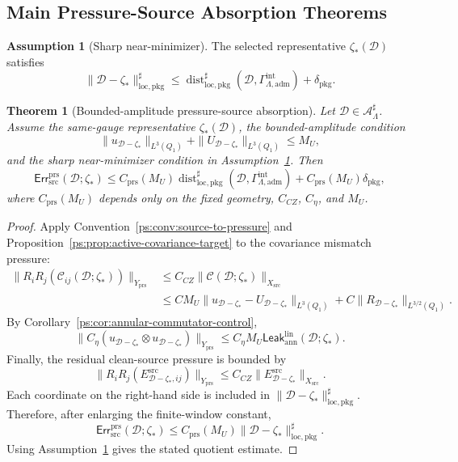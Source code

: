 \documentclass[11pt]{article}
\numberwithin{equation}{section}
\newtheorem{theorem}{Theorem}[section]
\theoremstyle{definition}
\newtheorem{assumption}[assumption]{Assumption}
\theoremstyle{remark}
\newcommand{\loc}{\mathrm{loc}}
\newcommand{\pkg}{\mathrm{pkg}}
\newcommand{\adm}{\mathrm{adm}}
\newcommand{\prs}{\mathrm{prs}}
\newcommand{\src}{\mathrm{src}}
\newcommand{\Err}{\mathsf{Err}}
\newcommand{\Leak}{\mathsf{Leak}}
\newcommand{\Dist}{\operatorname{dist}}
\newcommand{\calA}{\mathcal A}
\newcommand{\calD}{\mathcal D}
\newcommand{\Xsrc}{X_{\src}}
\newcommand{\Yprs}{Y_{\prs}}
\newcommand{\Qone}{Q_1}
\newcommand{\Gadm}{\Gamma^{\mathrm{int}}_{\Lambda,\adm}}
\begin{document}
\subsection{Main Pressure-Source Absorption Theorems}
\label{ps:sec:main-absorption}

\begin{assumption}[Sharp near-minimizer]
\label{ps:ass:sharp-near-minimizer}
The selected representative \(\zeta_*(\calD)\) satisfies
\[
    \|\calD-\zeta_*\|_{\loc,\pkg}^{\sharp}
    \le
    \Dist_{\loc,\pkg}^{\sharp}(\calD,\Gadm)
    +
    \delta_{\pkg}.
\]
\end{assumption}

\begin{theorem}[Bounded-amplitude pressure-source absorption]
\label{ps:thm:bounded-amplitude-pressure-source-absorption}
Let \(\calD\in\calA^\sharp_\Lambda\).  Assume the same-gauge representative
\(\zeta_*(\calD)\), the bounded-amplitude condition
\[
    \|u_{\calD-\zeta_*}\|_{L^3(\Qone)}
    +
    \|U_{\calD-\zeta_*}\|_{L^3(\Qone)}
    \le
    M_U,
\]
and the sharp near-minimizer condition in
Assumption~\ref{ps:ass:sharp-near-minimizer}.  Then
\[
    \Err^{\prs}_{\src}(\calD;\zeta_*)
    \le
    C_{\prs}(M_U)
    \Dist_{\loc,\pkg}^{\sharp}(\calD,\Gadm)
    +
    C_{\prs}(M_U)\delta_{\pkg},
\]
where \(C_{\prs}(M_U)\) depends only on the fixed geometry, \(C_{CZ}\),
\(C_\eta\), and \(M_U\).
\end{theorem}

\begin{proof}
Apply Convention~\ref{ps:conv:source-to-pressure} and
Proposition~\ref{ps:prop:active-covariance-target} to the covariance mismatch pressure:
\[
\begin{aligned}
    \|R_iR_j(\mathcal C_{ij}(\calD;\zeta_*))\|_{\Yprs}
    &\le
    C_{CZ}\|\mathcal C(\calD;\zeta_*)\|_{\Xsrc} \\
    &\le
    C M_U
    \|u_{\calD-\zeta_*}-U_{\calD-\zeta_*}\|_{L^3(\Qone)}
    +
    C\|R_{\calD-\zeta_*}\|_{L^{3/2}(\Qone)} .
\end{aligned}
\]
By Corollary~\ref{ps:cor:annular-commutator-control},
\[
    \|C_\eta(u_{\calD-\zeta_*}\otimes u_{\calD-\zeta_*})\|_{\Yprs}
    \le
    C_\eta M_U
    \Leak_{\mathrm{ann}}^{\mathrm{lin}}(\calD;\zeta_*).
\]
Finally, the residual clean-source pressure is bounded by
\[
    \|R_iR_j(E^{\src}_{\calD-\zeta_*,ij})\|_{\Yprs}
    \le
    C_{CZ}\|E^{\src}_{\calD-\zeta_*}\|_{\Xsrc}.
\]
Each coordinate on the right-hand side is included in
\(\|\calD-\zeta_*\|_{\loc,\pkg}^{\sharp}\).  Therefore, after enlarging the
finite-window constant,
\[
    \Err^{\prs}_{\src}(\calD;\zeta_*)
    \le
    C_{\prs}(M_U)\|\calD-\zeta_*\|_{\loc,\pkg}^{\sharp}.
\]
Using Assumption~\ref{ps:ass:sharp-near-minimizer} gives the stated quotient estimate.
\end{proof}
\end{document}
